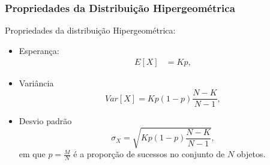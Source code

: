 \documentclass{beamer}
\theoremstyle{plain}
\begin{document}
  \begin{frame}
  	\frametitle{Propriedades da Distribuição Hipergeométrica}
  	Propriedades da distribuição Hipergeométrica:
  	\begin{itemize}
  		\item Esperança:
  		\begin{align}
  		E[X] & = Kp,
  		\end{align}
  		\item Variância
  		\begin{equation}
  		Var[X] = Kp(1 - p) \frac{N - K}{N - 1},
  		\end{equation}
  		\item Desvio padrão
  		\begin{equation}
  		\sigma_X = \sqrt{Kp(1-p) \frac{N - K}{N - 1}},
  		\end{equation}
  		em que $p = \frac{M}{N}$ é a proporção de sucessos no conjunto de $N$ objetos.
  	\end{itemize}
  \end{frame}
\end{document}
